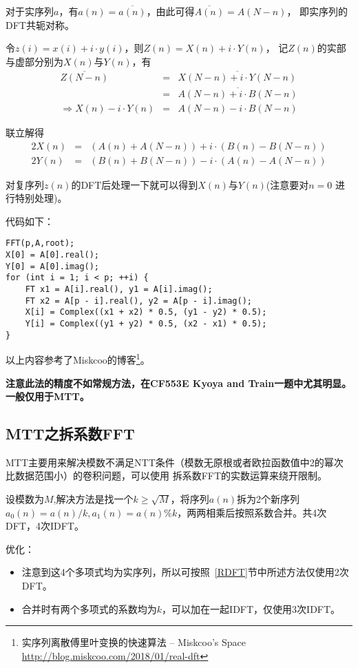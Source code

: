 对于实序列$a$，有$a(n)=\overline{a(n)}$，由此可得$\overline{A(n)}=A(N-n)$，
即实序列的DFT共轭对称。

令$z(i)=x(i)+i\cdot y(i)$，则$Z(n)=X(n)+i\cdot Y(n)$，
记$Z(n)$的实部与虚部分别为$X(n)$与$Y(n)$，有
\begin{eqnarray*}
	\overline{Z(N-n)}&=&\overline{X(N-n)+i\cdot Y(N-n)}\\
	&=&\overline{A(N-n)+i\cdot B(N-n)}\\
	\Rightarrow X(n)-i\cdot Y(n)&=&A(N-n)-i\cdot B(N-n)
\end{eqnarray*}

联立解得
\begin{eqnarray*}
	2X(n)&=&(A(n)+A(N-n))+i\cdot (B(n)-B(N-n))\\
	2Y(n)&=&(B(n)+B(N-n))-i\cdot (A(n)-A(N-n))
\end{eqnarray*}

对复序列$z(n)$的DFT后处理一下就可以得到$X(n)$与$Y(n)$(注意要对$n=0$
进行特别处理)。

代码如下：
\begin{lstlisting}
FFT(p,A,root);
X[0] = A[0].real();
Y[0] = A[0].imag();
for (int i = 1; i < p; ++i) {
	FT x1 = A[i].real(), y1 = A[i].imag();
	FT x2 = A[p - i].real(), y2 = A[p - i].imag();
	X[i] = Complex((x1 + x2) * 0.5, (y1 - y2) * 0.5);
	Y[i] = Complex((y1 + y2) * 0.5, (x2 - x1) * 0.5);
}
\end{lstlisting}

以上内容参考了Miskcoo的博客\footnote{实序列离散傅里叶变换的快速算法 – Miskcoo's Space
\url{http://blog.miskcoo.com/2018/01/real-dft}}。

{\bfseries 注意此法的精度不如常规方法，在CF553E Kyoya and Train一题中尤其明显。
一般仅用于MTT。}
\subsection{MTT之拆系数FFT}
MTT主要用来解决模数不满足NTT条件（模数无原根或者欧拉函数值中2的幂次比数据范围小）的卷积问题，可以使用
拆系数FFT的实数运算来绕开限制。

设模数为$M$,解决方法是找一个$k\geq\sqrt{M}$，将序列$a(n)$拆为2个新序列
$a_0(n)=a(n)/k,a_1(n)=a(n)\% k$，两两相乘后按照系数合并。共4次DFT，4次IDFT。

优化：
\begin{itemize}
	\item 注意到这4个多项式均为实序列，所以可按照~\ref{RDFT}节中所述方法仅使用2次DFT。
	\item 合并时有两个多项式的系数均为$k$，可以加在一起IDFT，仅使用3次IDFT。
\end{itemize}
